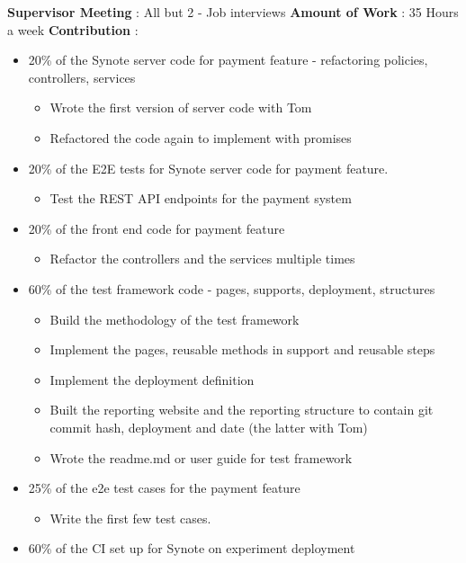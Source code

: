 \textbf{Supervisor Meeting} : All but 2 - Job interviews
\newline
\textbf{Amount of Work} : 35 Hours a week
\newline
\textbf{Contribution} :

\begin{itemize}
 \item 20\% of the Synote server code for payment feature - refactoring policies, controllers, services
 \begin{itemize}
  \item Wrote the first version of server code with Tom
  \item Refactored the code again to implement with promises
 \end{itemize}
 \item 20\% of the E2E tests for Synote server code for
  payment feature.
 \begin{itemize}
  \item Test the REST API endpoints for the payment system
 \end{itemize}
 \item 20\% of the front end code for payment feature
 \begin{itemize}
  \item Refactor the controllers and the services multiple times
 \end{itemize}
 \item 60\% of the test framework code - pages, supports, deployment, structures
 \begin{itemize}
  \item Build the methodology of the test framework
  \item Implement the pages, reusable methods in support and reusable steps
  \item Implement the deployment definition
  \item Built the reporting website and the reporting structure to contain git commit hash, deployment and date (the latter with Tom)
  \item Wrote the readme.md or user guide for test framework
 \end{itemize}
 \item 25\% of the e2e test cases for the payment feature
 \begin{itemize}
  \item Write the first few test cases.
 \end{itemize}
 \item 60\% of the CI set up for Synote on experiment deployment

\end{itemize}

